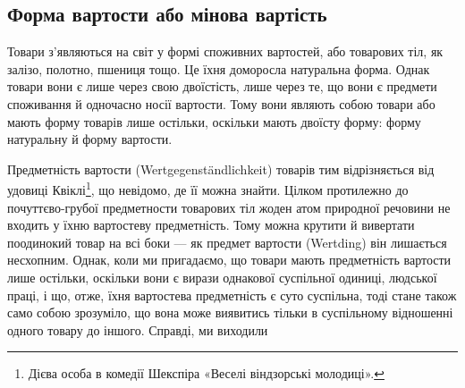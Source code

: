 \subsection{Форма вартости або мінова вартість}

Товари з’являються на світ у формі споживних вартостей, або
товарових тіл, як залізо, полотно, пшениця тощо. Це їхня доморосла
натуральна форма. Однак товари вони є лише через свою
двоїстість, лише через те, що вони є предмети споживання й одночасно
носії вартости. Тому вони являють собою товари або мають
форму товарів лише остільки, оскільки мають двоїсту форму:
форму натуральну й форму вартости.

Предметність вартости (Wertgegenständlichkeit) товарів тим
відрізняється від удовиці Квіклі\footnote*{Дієва особа в комедії
Шекспіра «Веселі віндзорські молодиці».
}, що невідомо, де її можна
знайти. Цілком протилежно до почуттєво-грубої предметности
товарових тіл жоден атом природної речовини не входить у їхню
вартостеву предметність. Тому можна крутити й вивертати поодинокий
товар на всі боки — як предмет вартости (Wertding)
він лишається несхопним. Однак, коли ми пригадаємо, що товари
мають предметність вартости лише остільки, оскільки вони є
вирази однакової суспільної одиниці, людської праці, і що, отже,
їхня вартостева предметність є суто суспільна, тоді стане також
само собою зрозуміло, що вона може виявитись тільки в суспільному
відношенні одного товару до іншого. Справді, ми виходили
\parbreak{}

